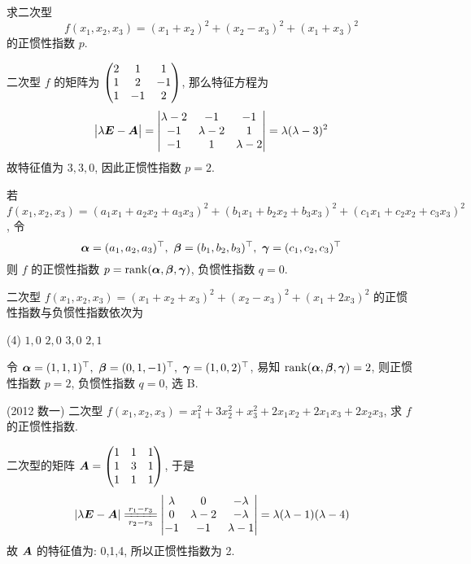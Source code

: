 \begin{example}
    \label{fx1x2x3p}求二次型 $$f(x_1,x_2,x_3)=(x_1+x_2)^2+(x_2-x_3)^2+(x_1+x_3)^2$$ 的正惯性指数 $p.$
\end{example}
\begin{solution}
    二次型 $f$ 的矩阵为 $\mqty(2&1&1\\1&2&-1\\1&-1&2)$, 那么特征方程为 $$\mqty|\lambda\vb*{E}-\vb*{A}|=\mqty|\lambda-2&-1&-1\\-1&\lambda-2&1\\-1&1&\lambda-2|=\lambda(\lambda-3)^2$$
    故特征值为 $3,3,0$, 因此正惯性指数 $p=2.$
\end{solution}

\begin{theorem}
    若 $f(x_1,x_2,x_3)=(a_1x_1+a_2x_2+a_3x_3)^2+(b_1x_1+b_2x_2+b_3x_3)^2+(c_1x_1+c_2x_2+c_3x_3)^2$, 令
    $$\vb*{\alpha}=(a_1,a_2,a_3)^\top,~\vb*{\beta}=(b_1,b_2,b_3)^\top,~\vb*{\gamma}=(c_1,c_2,c_3)^\top$$
    则 $f$ 的正惯性指数 $p=\rank(\vb*{\alpha},\vb*{\beta},\vb*{\gamma})$, 负惯性指数 $q=0.$
\end{theorem}

\begin{example}
    二次型 $f(x_1,x_2,x_3)=(x_1+x_2+x_3)^2+(x_2-x_3)^2+(x_1+2x_3)^2$ 的正惯性指数与负惯性指数依次为
    \begin{tasks}(4)
        \task $1,0$
        \task $2,0$
        \task $3,0$
        \task $2,1$
    \end{tasks}
\end{example}
\begin{solution}
    令 $\vb*{\alpha}=(1,1,1)^\top,~\vb*{\beta}=(0,1,-1)^\top,~\vb*{\gamma}=(1,0,2)^\top$, 易知 $\rank(\vb*{\alpha},\vb*{\beta},\vb*{\gamma})=2$, 则正惯性指数 $p=2$, 负惯性指数 $q=0$, 选 B.
\end{solution}

\begin{example}
    (2012 数一) 二次型 $f(x_1,x_2,x_3)=x_1^2+3x_2^2+x_3^2+2x_1x_2+2x_1x_3+2x_2x_3$, 求 $f$ 的正惯性指数.
\end{example}
\begin{solution}
    二次型的矩阵 $\vb*{A}=\mqty(1&1&1\\1&3&1\\1&1&1)$, 于是
    $$|\lambda\vb*{E}-\vb*{A}|\xlongequal[r_2-r_3]{r_1-r_3}\mqty|\lambda&0&-\lambda\\0&\lambda-2&-\lambda\\-1&-1&\lambda-1|=\lambda(\lambda-1)(\lambda-4)$$
    故 $\vb*{A}$ 的特征值为: 0,1,4, 所以正惯性指数为 2.
\end{solution}

